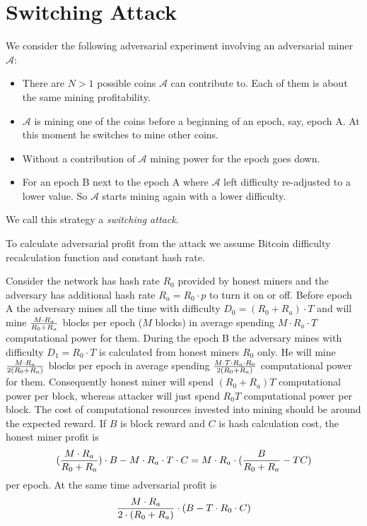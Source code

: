 \documentclass[]{llncs}
\begin{document}
\section{Switching Attack}
\label{sec:attack}

We consider the following adversarial experiment involving an adversarial miner \(\mathcal{A}\):

\begin{itemize}
\item There are \(N > 1\) possible coins \(\mathcal{A}\) can contribute to. Each of them is about the same mining profitability. 
\item \(\mathcal{A}\) is mining one of the coins before a beginning of an epoch, say, epoch A. At this moment he switches to mine other coins. 
\item Without a contribution of \(\mathcal{A}\) mining power for the epoch goes down. 
\item For an epoch B next to the epoch A where \(\mathcal{A}\) left difficulty re-adjusted to a lower value. So \(\mathcal{A}\) starts mining again with a lower difficulty. 
\end{itemize}

We call this strategy a \textit{switching attack}.

To calculate adversarial profit from the attack we assume Bitcoin difficulty recalculation function and constant hash rate.

Consider the network has hash rate \(R_0\) provided by honest miners and the adversary has additional hash rate \(R_a=R_0\cdot p\) to turn it on or off.
Before epoch A the adversary mines all the time with difficulty \(D_0 = (R_0+R_a) \cdot T\) and will mine \(M\cdot R_a\over R_0+R_a\) blocks per epoch (\(M\) blocks) in average spending \(M \cdot R_a \cdot T\) computational power for them.
During the epoch B the adversary mines with difficulty \(D_1 = R_0 \cdot T\) is calculated from honest miners \(R_0\) only.
He will mine \(M\cdot R_a\over 2(R_0+R_a)\) blocks per epoch in average spending \(M\cdot T\cdot R_a\cdot R_0\over 2(R_0+R_a)\) computational power for them.
Consequently honest miner will spend \((R_0+R_a)T\) computational power per block, whereas attacker will just spend \(R_0T\) computational power per block.
The cost of computational resources invested into mining should be around the expected reward.
If \(B\) is block reward and \(C\) is hash calculation cost, the honest miner profit is
\begin{equation}
{({M\cdot R_a\over R_0+R_a})\cdot B-M\cdot R_a\cdot T\cdot C=M\cdot R_a\cdot ({B\over R_0+R_a}-TC)}
\end{equation}
per epoch.
At the same time adversarial profit is
\begin{equation}
{{M\cdot R_a \over 2\cdot (R_0+R_a)}\cdot (B - T\cdot R_0\cdot C)}
\end{equation}
\end{document}

